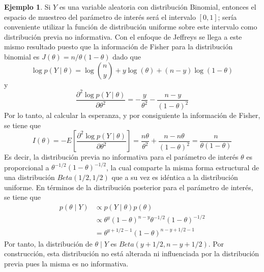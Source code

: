 \documentclass[
  spanish,
]{book}
\theoremstyle{definition}
\theoremstyle{definition}
\newtheorem{example}{Ejemplo}[chapter]
\theoremstyle{definition}
\theoremstyle{remark}
\begin{document}
\begin{example}
\protect\hypertarget{exm:unnamed-chunk-19}{}{\label{exm:unnamed-chunk-19} }Si \(Y\) es una variable aleatoria con distribución Binomial, entonces el espacio de muestreo del parámetro de interés será el intervalo \([0,1]\); sería conveniente utilizar la función de distribución uniforme sobre este intervalo como distribución previa no informativa. Con el enfoque de Jeffreys se llega a este mismo resultado puesto que la información de Fisher para la distribución binomial es \(J(\theta)=n/\theta(1- \theta)\) dado que
\begin{equation*}
\log p(Y \mid \theta)=\log \binom{n}{y} + y\log(\theta)+(n-y)\log(1-\theta)
\end{equation*}
y
\begin{equation*}
\frac{\partial^2 \log p(Y \mid \theta)}{\partial\theta^2}=-\frac{y}{\theta^2}-\frac{n-y}{(1-\theta)^2}
\end{equation*}
Por lo tanto, al calcular la esperanza, y por consiguiente la información de Fisher, se tiene que
\begin{equation*}
I(\theta)=- E\left[\frac{\partial^2 \log p(Y \mid \theta)}{\partial\theta^2}\right]
=\frac{n\theta}{\theta^2}+\frac{n-n\theta}{(1-\theta)^2}= \frac{n}{\theta(1-\theta)}
\end{equation*}
Es decir, la distribución previa no informativa para el parámetro de interés \(\theta\) es proporcional a \(\theta^{-1/2}(1-\theta)^{-1/2}\), la cual comparte la misma forma estructural de una distribución \(Beta(1/2,1/2)\) que a su vez es idéntica a la distribución uniforme. En términos de la distribución posterior para el parámetro de interés, se tiene que
\begin{align*}
p(\theta \mid Y) &\propto p(Y \mid \theta) p(\theta)\\
&\propto \theta^{y}(1-\theta)^{n-y}\theta^{-1/2}(1-\theta)^{-1/2}\\
&=\theta^{y+1/2-1}(1-\theta)^{n-y+1/2-1}
\end{align*}
Por tanto, la distribución de \(\theta \mid Y\) es \(Beta(y+1/2,n-y+1/2)\). Por construcción, esta distribución no está alterada ni influenciada por la distribución previa pues la misma es no informativa.
\end{example}
\end{document}
